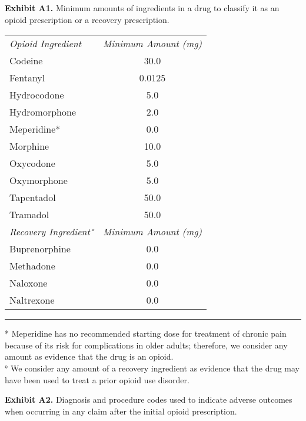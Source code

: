 \documentclass[11pt, letter]{article}
\begin{document}
\theendnotes

\newpage

\textbf{Exhibit A1.} Minimum amounts of ingredients in a drug to classify it as an opioid prescription or a recovery prescription.

\begin{tabular}{lc}
\em Opioid Ingredient & \em Minimum Amount (mg) \\[0.5em]
Codeine & 30.0 \\
Fentanyl & 0.0125 \\
Hydrocodone & 5.0 \\
Hydromorphone & 2.0 \\
Meperidine* & 0.0 \\
Morphine & 10.0 \\
Oxycodone & 5.0 \\
Oxymorphone & 5.0 \\
Tapentadol & 50.0 \\
Tramadol & 50.0 \\[1em]
\em Recovery Ingredient° & \em Minimum Amount (mg) \\[0.5em]
Buprenorphine & 0.0 \\
Methadone & 0.0 \\
Naloxone & 0.0 \\
Naltrexone & 0.0 \\[1em]
\end{tabular}

\hrule

\footnotesize
* Meperidine has no recommended starting dose for treatment of chronic pain because of its risk for complications in older adults; therefore, we consider any amount as evidence that the drug is an opioid. \\
° We consider any amount of a recovery ingredient as evidence that the drug may have been used to treat a prior opioid use disorder.
\normalsize

\newpage

\textbf{Exhibit A2.} Diagnosis and procedure codes used to indicate adverse outcomes when occurring in any claim after the initial opioid prescription.
\end{document}
